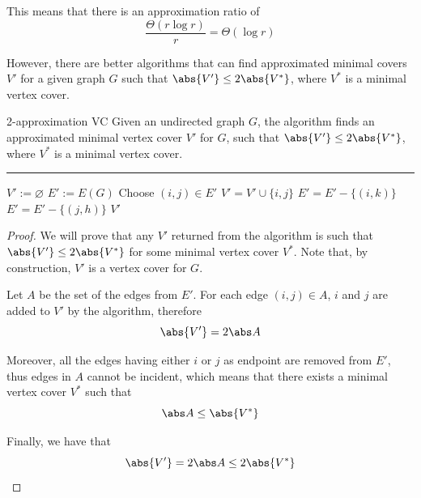 \documentclass[a4paper, 12pt]{report}
\begin{document}
    This means that there is an approximation ratio of $$\dfrac{\Theta(r \log r)}{r} = \Theta(\log r)$$

    However, there are better algorithms that can find approximated minimal covers  $V'$ for a given graph $G$ such that $\abs{V'} \le 2 \abs {V^*}$, where $V^*$ is a minimal vertex cover.

    \begin{framedalgo}{2-approximation VC}
        Given an undirected graph $G$, the algorithm finds an approximated minimal vertex cover $V'$ for $G$, such that $\abs{V'} \le 2 \abs {V^*}$, where $V^*$ is a minimal vertex cover. \\
        \hrule

        \quad
        \label{alg:2-approx_vc}
        \begin{algorithmic}[1]
                \State $V' := \varnothing$
                \State $E' := E(G)$
                    \State Choose $(i, j) \in E'$
                    \State $V' = V' \cup \{i, j\}$
                     
                        \State $E' = E' - \{(i, k) \}$
                    \EndFor
                     
                        \State $E' = E' - \{(j, h) \}$
                    \EndFor
                \EndWhile
                \State {} $V'$
            \EndFunction
        \end{algorithmic}
    \end{framedalgo}



    \begin{proof}
        We will prove that any $V'$ returned from the algorithm is such that $\abs{V'} \le 2 \abs {V^*}$ for some minimal vertex cover $V^*$. Note that, by construction, $V'$ is a vertex cover for $G$.

        Let $A$ be the set of the edges  from $E'$. For each edge $(i, j) \in A$, $i$ and $j$ are added to $V'$ by the algorithm, therefore $$\abs{V'} = 2 \abs A$$

        Moreover, all the edges having either $i$ or $j$ as endpoint are removed from $E'$, thus edges in $A$ cannot be incident, which means that there exists a minimal vertex cover $V^*$ such that $$\abs A \le \abs{V^*}$$

        Finally, we have that $$\abs{V'} = 2 \abs A \le 2 \abs{V^*}$$
    \end{proof}
\end{document}

